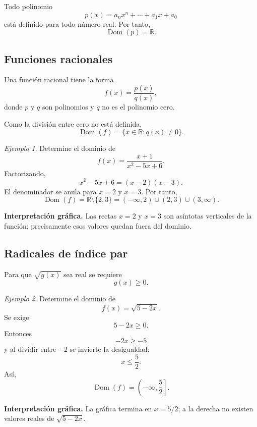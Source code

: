 \documentclass[12pt]{article}
\theoremstyle{remark}
\newtheorem{ejemplo}{Ejemplo}[section]
\newcommand{\R}{\mathbb{R}}
\newcommand{\Dom}{\operatorname{Dom}}
\begin{document}
Todo polinomio
\[
p(x)=a_nx^n+\cdots+a_1x+a_0
\]
está definido para todo número real. Por tanto,
\[
\Dom(p)=\R.
\]

\subsection{Funciones racionales}

Una función racional tiene la forma
\[
f(x)=\frac{p(x)}{q(x)},
\]
donde $p$ y $q$ son polinomios y $q$ no es el polinomio cero.

Como la división entre cero no está definida,
\[
\Dom(f)=\{x\in\R:q(x)\neq0\}.
\]

\begin{ejemplo}
Determine el dominio de
\[
f(x)=\frac{x+1}{x^2-5x+6}.
\]
Factorizando,
\[
x^2-5x+6=(x-2)(x-3).
\]
El denominador se anula para $x=2$ y $x=3$. Por tanto,
\[
\Dom(f)=\R\setminus\{2,3\}
=(-\infty,2)\cup(2,3)\cup(3,\infty).
\]

\textbf{Interpretación gráfica.} Las rectas $x=2$ y $x=3$ son asíntotas
verticales de la función; precisamente esos valores quedan fuera del dominio.
\begin{center}
\end{center}
\end{ejemplo}

\subsection{Radicales de índice par}

Para que $\sqrt{g(x)}$ sea real se requiere
\[
g(x)\geq0.
\]

\begin{ejemplo}
Determine el dominio de
\[
f(x)=\sqrt{5-2x}.
\]
Se exige
\[
5-2x\geq0.
\]
Entonces
\[
-2x\geq-5
\]
y al dividir entre $-2$ se invierte la desigualdad:
\[
x\leq\frac52.
\]
Así,
\[
\Dom(f)=\left(-\infty,\frac52\right].
\]

\textbf{Interpretación gráfica.} La gráfica termina en $x=5/2$; a la derecha
no existen valores reales de $\sqrt{5-2x}$.
\begin{center}
\end{center}
\end{ejemplo}
\end{document}
